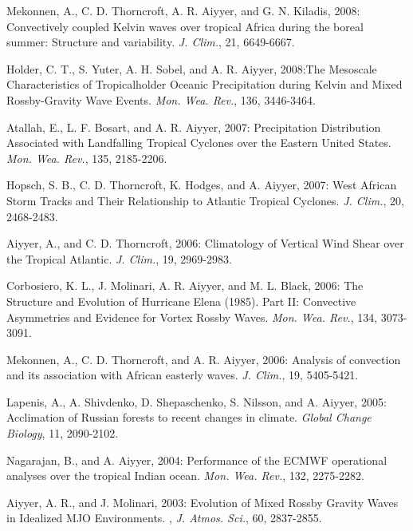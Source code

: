 \begin{ilist}
\item Mekonnen, A., C. D. Thorncroft, A. R. Aiyyer, and G. N. Kiladis, 2008: Convectively coupled Kelvin waves over tropical Africa during the boreal summer: Structure and variability. \emph{J. Clim.}, 21, 6649-6667.

\item Holder, C. T., S. Yuter, A. H. Sobel, and A. R. Aiyyer, 2008:The Mesoscale Characteristics of Tropicalholder Oceanic Precipitation during Kelvin and Mixed Rossby-Gravity Wave Events. \emph{Mon. Wea. Rev.}, 136, 3446-3464. 

\item Atallah, E., L. F. Bosart, and A. R. Aiyyer, 2007: Precipitation Distribution Associated with Landfalling Tropical Cyclones over the Eastern United States. \emph{Mon. Wea. Rev.}, 135, 2185-2206.

\item Hopsch, S. B., C. D. Thorncroft, K. Hodges, and A. Aiyyer, 2007: West African Storm Tracks and Their Relationship to Atlantic Tropical Cyclones. \emph{J. Clim.}, 20, 2468-2483.

\item Aiyyer, A., and C. D. Thorncroft, 2006: Climatology of Vertical Wind Shear over the Tropical Atlantic. \emph{J. Clim.}, 19, 2969-2983.

\item Corbosiero, K. L., J. Molinari, A. R. Aiyyer, and M. L. Black, 2006: The Structure and Evolution of Hurricane Elena (1985). Part II: Convective Asymmetries and Evidence for Vortex Rossby Waves. \emph{Mon. Wea. Rev.}, 134, 3073-3091. 

\item Mekonnen, A., C. D. Thorncroft, and A. R. Aiyyer, 2006: Analysis of convection and its association with African easterly waves. \emph{J. Clim.}, 19, 5405-5421.

\item Lapenis, A., A. Shivdenko, D. Shepaschenko, S. Nilsson, and A. Aiyyer, 2005: Acclimation of Russian forests to recent changes in climate. \emph{ Global Change Biology}, 11, 2090-2102.

\item Nagarajan, B., and A. Aiyyer, 2004: Performance of the ECMWF operational analyses over the tropical Indian ocean. \emph{Mon. Wea. Rev.}, 132, 2275-2282. 

\item Aiyyer, A. R., and J. Molinari, 2003: Evolution of Mixed Rossby Gravity Waves in Idealized MJO Environments. , \emph{J. Atmos. Sci.}, 60, 2837-2855.

\end{ilist}

